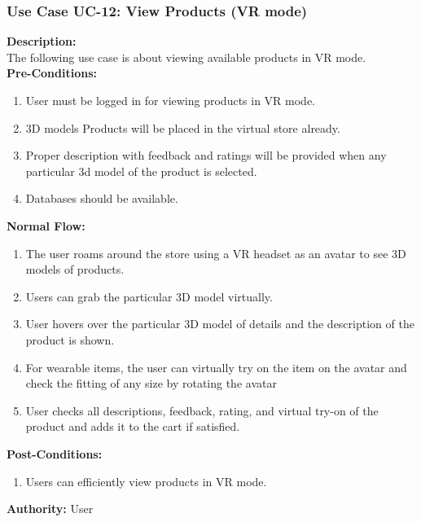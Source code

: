 \subsubsection{Use Case UC-12: View Products (VR mode) }
\textbf{Description:}\\
The following use case is about viewing available products in VR mode. 
\\
\textbf{Pre-Conditions:}
\begin{enumerate}
    \item User must be logged in for viewing products in VR mode.
\item 3D models Products will be placed in the virtual store already. 
\item Proper description with feedback and ratings will be provided when any particular 3d model of the product is selected.
 \item Databases should be available. 
\end{enumerate}
\textbf{Normal Flow:}\\
\begin{enumerate}
\item The user roams around the store using a VR headset as an avatar to see 3D models of products. 
\item Users can grab the particular 3D model virtually.
\item User hovers over the particular 3D model of details and the description of the product is shown. 
\item For wearable items, the user can virtually try on the item on the avatar and check the fitting of any size by rotating the avatar 
\item User checks all descriptions, feedback, rating, and virtual try-on of the product and adds it to the cart if satisfied. 
\end{enumerate}
\textbf{Post-Conditions: }
\begin{enumerate}
\item	Users can efficiently view products in VR mode.
\end{enumerate}
\textbf{Authority:}
User
